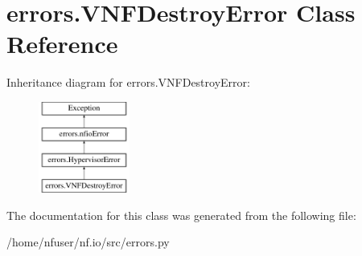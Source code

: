 \hypertarget{classerrors_1_1VNFDestroyError}{\section{errors.\-V\-N\-F\-Destroy\-Error Class Reference}
\label{classerrors_1_1VNFDestroyError}
}
Inheritance diagram for errors.\-V\-N\-F\-Destroy\-Error\-:\begin{figure}[H]
\begin{center}
\leavevmode
\includegraphics[height=3.000000cm]{classerrors_1_1VNFDestroyError}
\end{center}
\end{figure}


The documentation for this class was generated from the following file\-:\begin{DoxyCompactItemize}
\item 
/home/nfuser/nf.\-io/src/errors.\-py\end{DoxyCompactItemize}
